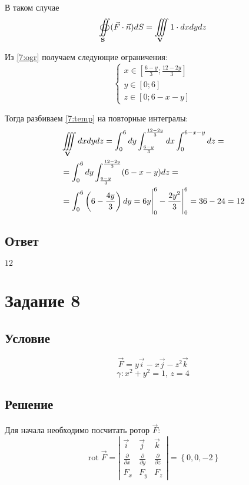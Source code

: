 \documentclass{report}
\newcommand*\task[1]{
       \chapter{#1}
       \section{Условие}
}
\newcommand*\tripleint[2]{\iiint\limits_{#1}#2}
\newcommand*\partialofby[2]{\frac{\partial #1}{\partial #2}}
\begin{document}
В таком случае
\begin{equation}
    \label{7:temp}
    \oiint\limits_{{\bf{S}}} (\vec{F} \cdot \vec{n})dS = \tripleint{{\bf{V}}}{1 \cdot dx dy dz}
\end{equation}

Из \ref{7:ogr} получаем следующие ограничения:
$$
    \begin{cases}
        x \in \left[\frac{6 - y}{3}; \frac{12 - 2y}{3}\right] \\
        y \in \left[0; 6\right]                               \\
        z \in \left[0; 6 - x - y\right]
    \end{cases}
$$

Тогда разбиваем \ref{7:temp} на повторные интегралы:
\begin{align*}
     & \tripleint{{\bf{V}}}{dx dy dz} = \int_{0}^{6} dy \int_{\frac{6 - y}{3}}^{\frac{12 - 2y}{3}} dx \int_{0}^{6 - x - y} dz = \\
     & = \int_{0}^{6} dy \int_{\frac{6 - y}{3}}^{\frac{12 - 2y}{3}}(6 - x - y)dz =                                              \\
     & = \int_{0}^{6} \left( 6 - \frac{4y}{3} \right) dy = 6y \Biggr|_{0}^{6} - \frac{2y^2}{3}\Biggr|_{0}^{6} = 36 - 24 = 12
\end{align*}

\section{Ответ}

$12$

\task{Задание 8}

\begin{equation}
    \label{8:usl}
    \vec{F} = y \vec{i} - x \vec{j} - z^2 \vec{k}
\end{equation}
\begin{equation}
    \label{8:ogr}
    {\gamma: x^2 + y^2 = 1 \mbox{, } z = 4}
\end{equation}

\section{Решение}

Для начала необходимо посчитать ротор $\vec{F}$:
$$
    \operatorname{rot}\vec{F} = \left| \begin{matrix}
        \vec{i}           & \vec{j}           & \vec{k}           \\
        \partialofby{}{x} & \partialofby{}{y} & \partialofby{}{z} \\
        F_x               & F_y               & F_z
    \end{matrix} \right| = \left\{ 0, 0, -2 \right\}
$$
\end{document}
